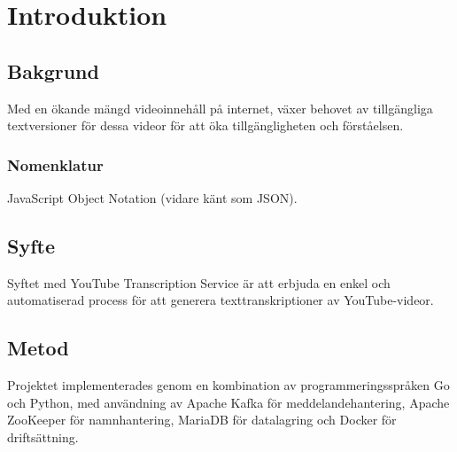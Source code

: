 \chapter{Introduktion}

\section{Bakgrund}
Med en ökande mängd videoinnehåll på internet, växer behovet av tillgängliga textversioner för dessa videor för att öka tillgängligheten och förståelsen.

\subsection{Nomenklatur}
JavaScript Object Notation (vidare känt som JSON).

\section{Syfte}
Syftet med YouTube Transcription Service är att erbjuda en enkel och automatiserad process för att generera texttranskriptioner av YouTube-videor.

\section{Metod}
Projektet implementerades genom en kombination av programmeringsspråken Go och Python,
med användning av Apache Kafka för meddelandehantering, Apache ZooKeeper för namnhantering,
MariaDB för datalagring och Docker för driftsättning.
